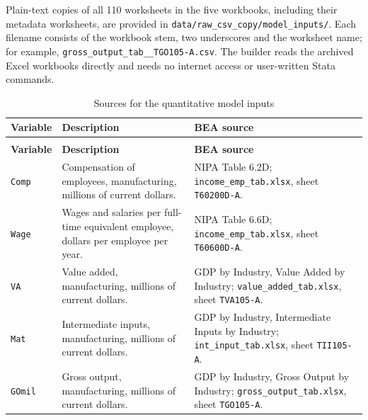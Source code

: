 \documentclass[11pt]{article}
\newcommand{\pkgfile}[1]{\nolinkurl{#1}}
\begin{document}
Plain-text copies of all 110 worksheets in the five workbooks, including
their metadata worksheets, are provided in
\pkgfile{data/raw_csv_copy/model_inputs/}. Each filename consists of the
workbook stem, two underscores and the worksheet name; for example,
\pkgfile{gross_output_tab__TGO105-A.csv}. The builder reads the archived
Excel workbooks directly and needs no internet access or user-written
Stata commands.


{\small\renewcommand{\arraystretch}{1.15}\setlength{\extrarowheight}{2pt}
\begin{longtable}{@{}>{\raggedright\arraybackslash}p{2.4cm}
                    >{\raggedright\arraybackslash}p{6.0cm}
                    >{\raggedright\arraybackslash}p{6.5cm}@{}}
\caption{Sources for the quantitative model inputs\label{tab:model}}\\
\toprule
\textbf{Variable} & \textbf{Description} & \textbf{BEA source}\\
\midrule
\endfirsthead
\multicolumn{3}{@{}l}{\emph{Table \ref{tab:model} continued}}\\
\toprule
\textbf{Variable} & \textbf{Description} & \textbf{BEA source}\\
\midrule
\endhead
\bottomrule
\endfoot

\texttt{Comp}
& Compensation of employees, manufacturing, millions of current dollars.
& NIPA Table 6.2D; \pkgfile{income_emp_tab.xlsx}, sheet \pkgfile{T60200D-A}.
\\[7pt]

\texttt{Wage}
& Wages and salaries per full-time equivalent employee, dollars per employee per year.
& NIPA Table 6.6D; \pkgfile{income_emp_tab.xlsx}, sheet \pkgfile{T60600D-A}.
\\[7pt]

\texttt{VA}
& Value added, manufacturing, millions of current dollars.
& GDP by Industry, Value Added by Industry; \pkgfile{value_added_tab.xlsx}, sheet \pkgfile{TVA105-A}.
\\[7pt]

\texttt{Mat}
& Intermediate inputs, manufacturing, millions of current dollars.
& GDP by Industry, Intermediate Inputs by Industry; \pkgfile{int_input_tab.xlsx}, sheet \pkgfile{TII105-A}.
\\[7pt]

\texttt{GOmil}
& Gross output, manufacturing, millions of current dollars.
& GDP by Industry, Gross Output by Industry; \pkgfile{gross_output_tab.xlsx}, sheet \pkgfile{TGO105-A}.
\\[7pt]


\end{longtable}}
\end{document}
